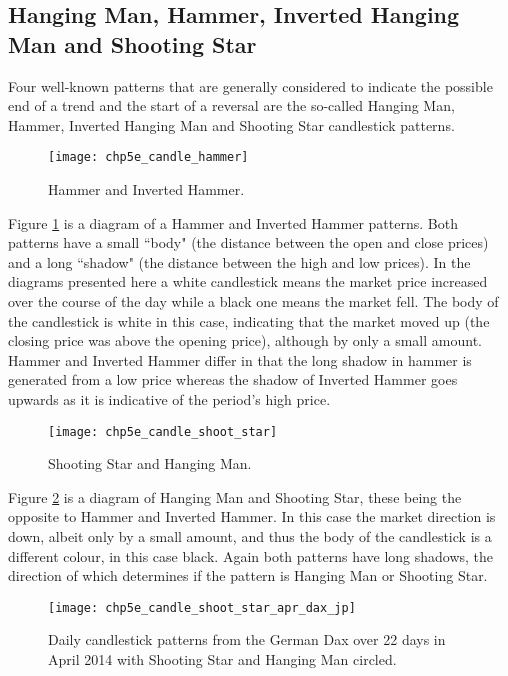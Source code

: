 \subsection{Hanging Man, Hammer, Inverted Hanging Man and Shooting Star}
Four well-known patterns that are generally considered to indicate the possible end of a trend and the start of a reversal are the so-called Hanging Man, Hammer, Inverted Hanging Man and Shooting Star candlestick patterns. 

\begin{figure}[tbph]
\centering
\texttt{[image: chp5e\_candle\_hammer]}
\caption[Shooting Star.]{Hammer and Inverted Hammer.}
\label{fig:chp5e:hammer}
\end{figure}

Figure \ref{fig:chp5e:hammer} is a diagram of a Hammer and Inverted Hammer patterns. Both patterns have a small \textquotedblleft body" (the distance between the open and close prices) and a long \textquotedblleft shadow" (the distance between the high and low prices). In the diagrams presented here a white candlestick means the market price increased over the course of the day while a black one means the market fell. The body of the candlestick is white in this case, indicating that the market moved up (the closing price was above the opening price), although by only a small amount. Hammer and Inverted Hammer differ in that the long shadow in hammer is generated from a low price whereas the shadow of Inverted Hammer goes upwards as it is indicative of the period's high price.

\begin{figure}[tbph]
\centering
\texttt{[image: chp5e\_candle\_shoot\_star]}
\caption[Shooting Star.]{Shooting Star and Hanging Man.}
\label{fig:chp5e:shoot_star}
\end{figure}

Figure \ref{fig:chp5e:shoot_star} is a diagram of Hanging Man and Shooting Star, these being the opposite to Hammer and Inverted Hammer. In this case the market direction is down, albeit only by a small amount, and thus the body of the candlestick is a different colour, in this case black. Again both patterns have long shadows, the direction of which determines if the pattern is Hanging Man or Shooting Star.

\begin{figure}[tbph]
\centering
\texttt{[image: chp5e\_candle\_shoot\_star\_apr\_dax\_jp]}
\caption [Dax Candlestick Patterns April 2014.]{Daily candlestick patterns from the German Dax over 22 days in April 2014 with Shooting Star and Hanging Man circled.}
\label{fig:chp5e:shoot_star_dax}
\end{figure}

